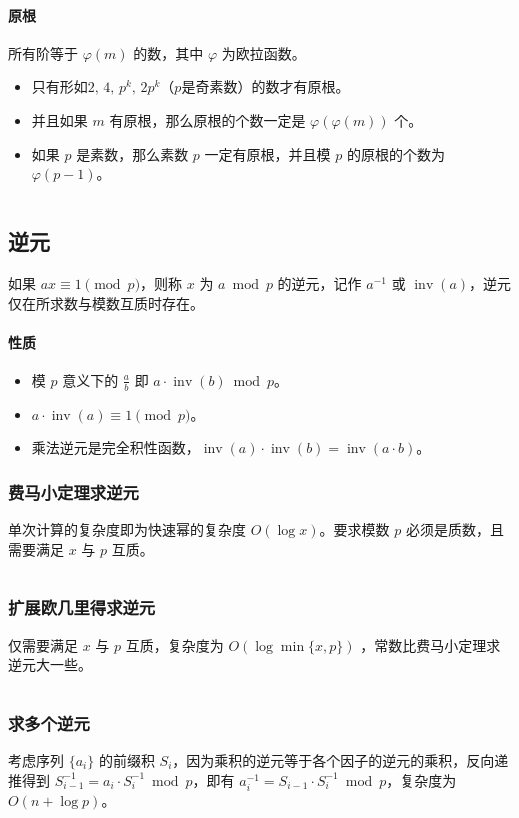 \documentclass[a4paper, twoside]{article}
\DeclareMathOperator*{\inv}{inv}                %
\begin{document}
\paragraph{原根} 所有阶等于 $\varphi(m)$ 的数，其中 $\varphi$ 为欧拉函数。
\begin{itemize}
    \item 只有形如$2,\, 4,\, p^k,\, 2 p^k$（$p$是奇素数）的数才有原根。
    \item 并且如果 $m$ 有原根，那么原根的个数一定是 $\varphi\left(\varphi(m)\right)$ 个。
    \item 如果 $p$ 是素数，那么素数 $p$ 一定有原根，并且模 $p$ 的原根的个数为 $\varphi(p − 1)$。
\end{itemize}
\inputminted{cpp}{../src/数论/原根.cpp}


\subsection{逆元}
如果 $ax \equiv 1\pmod p$，则称 $x$ 为 $a \bmod p$ 的逆元，记作 $a^{-1}$ 或 $\inv(a)$，逆元仅在所求数与模数互质时存在。
\paragraph{性质}
\begin{itemize}
    \item 模 $p$ 意义下的 $\frac{a}{b}$ 即 $a \cdot \inv(b) \bmod p$。
    \item $a \cdot \inv(a) \equiv 1\pmod p$。
    \item 乘法逆元是完全积性函数，$\inv(a) \cdot \inv(b) = \inv(a \cdot b)$。
\end{itemize}



    \subsubsection{费马小定理求逆元}
    单次计算的复杂度即为快速幂的复杂度 $O(\log x)$。要求模数 $p$ 必须是质数，且需要满足 $x$ 与 $p$ 互质。
    \inputminted{cpp}{../src/数论/费马小定理求逆元.cpp}

    \subsubsection{扩展欧几里得求逆元}
    仅需要满足 $x$ 与 $p$ 互质，复杂度为 $O(\log \min\{x, p\})$ ，常数比费马小定理求逆元大一些。
    \inputminted{cpp}{../src/数论/扩展欧几里得求逆元.cpp}

    \subsubsection{求多个逆元}
    考虑序列 $\{a_i\}$ 的前缀积 $S_i$，因为乘积的逆元等于各个因子的逆元的乘积，反向递推得到 $S_{i-1}^{-1}=a_i \cdot S_i^{-1} \bmod p$，即有 $a_i^{-1}=S_{i-1} \cdot S_i^{-1} \bmod p$，复杂度为 $O(n + \log p)$。
    \inputminted{cpp}{../src/数论/求多个逆元.cpp}
\end{document}
